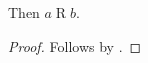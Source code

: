 \begin{proposition}\label{exact_relation_expression_missing_pair}
    Then $a\mathrel{R}b$.
\end{proposition}
\begin{proof}
    Follows by \auto.
\end{proof}
